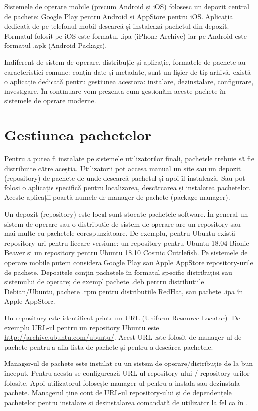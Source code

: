 Sistemele de operare mobile (precum Android și iOS) folosesc un depozit central de pachete: Google Play pentru Android și AppStore pentru iOS. Aplicația dedicată de pe telefonul mobil descarcă și instalează pachetul din depozit. Formatul folosit pe iOS este formatul .ipa (iPhone Archive) iar pe Android este formatul .apk (Android Package).

Indiferent de sistem de operare, distribuție și aplicație, formatele de pachete au caracteristici comune: conțin date și metadate, sunt un fișier de tip arhivă, există o aplicație dedicată pentru gestiunea acestora: instalare, dezinstalare, configurare, investigare. În continuare vom prezenta cum gestionăm aceste pachete în sistemele de operare moderne.

\section{Gestiunea pachetelor}
\label{sec:package:manage}

Pentru a putea fi instalate pe sistemele utilizatorilor finali, pachetele trebuie să fie distribuite către aceștia. Utilizatorii pot accesa manual un site sau un depozit (repository) de pachete de unde descarcă pachetul și apoi îl instalează. Sau pot folosi o aplicație specifică pentru localizarea, descărcarea și instalarea pachetelor. Aceste aplicații poartă numele de manager de pachete (package manager).

Un depozit (repository) este locul sunt stocate pachetele software. În general un sistem de operare sau o distribuție de sistem de operare are un repository sau mai multe cu pachetele corespunzătoare. De exemplu, pentru Ubuntu există repository-uri pentru fiecare versiune: un repository pentru Ubuntu 18.04 Bionic Beaver și un repository pentru Ubuntu 18.10 Cosmic Cuttlefish. Pe sistemele de operare mobile putem considera Google Play sau Apple AppStore repository-urile de pachete. Depozitele conțin pachetele în formatul specific distribuției sau sistemului de operare; de exempl pachete .deb pentru distribuțiile Debian/Ubuntu, pachete .rpm pentru distribuțiile RedHat, sau pachete .ipa în Apple AppStore.

Un repository este identificat printr-un URL (Uniform Resource Locator). De exemplu URL-ul pentru un repository Ubuntu este \url{http://archive.ubuntu.com/ubuntu/}. Acest URL este folosit de manager-ul de pachete pentru a afla lista de pachete și pentru a descărca pachetele.

Manager-ul de pachete este instalat cu un sistem de operare/distribuție de la bun început. Pentru acesta se configurează URL-ul repository-ului / repository-urilor folosite. Apoi utilizatorul folosește manager-ul pentru a instala sau dezinstala pachete. Managerul ține cont de URL-ul repository-ului și de dependențele pachetelor pentru instalare și dezinstalarea comandată de utilizator la fel ca în .

